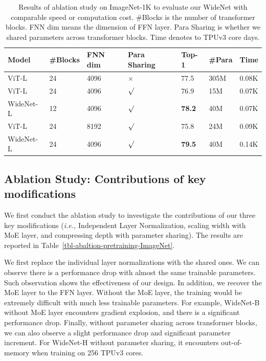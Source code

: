 \documentclass[letterpaper]{article} %
\newcommand{\ie}{\emph{i.e.,}\xspace}
\begin{document}
\begin{table}[t]
\centering
\caption{Results of ablation study on ImageNet-1K to evaluate our WideNet with comparable speed or computation cost. \#Blocks is the number of transformer blocks. FNN dim means the dimension of FFN layer. Para Sharing is whether we shared parameters across transformer blocks. Time denotes to TPUv3 core days.}
\label{tbl-abaltion-2-pretraining-ImageNet}
\begin{tabular}{l|llllll}
\toprule
Model                    & \#Blocks    & FNN dim   & Para Sharing   & Top-1 & \#Para & Time \\ \midrule
ViT-L                     & 24     & 4096    & $\times$  & 77.5 & 305M       & 0.08K         \\
ViT-L                     & 24     & 4096    & $\surd$  & 76.9 & 15M       & 0.07K         \\
WideNet-L                 & 12     & 4096    & $\surd$  & \textbf{78.2} & 40M        & 0.07K          \\ \midrule
ViT-L    & 24     & 8192   & $\surd$  & 75.8 & 24M        & 0.09K         \\
WideNet-L                   & 24    & 4096   & $\surd$  & \textbf{79.5} & 40M        & 0.14K       \\
\bottomrule
\end{tabular}
\end{table}





\subsection{Ablation Study: Contributions of key modifications}
We first conduct the ablation study to investigate the contributions of our three key modifications (\ie Independent Layer Normalization, scaling width with MoE layer, and compressing depth with parameter sharing). The results are reported in Table~\ref{tbl-abaltion-pretraining-ImageNet}. 


We first replace the individual layer normalizations with the shared ones. We can observe there is a performance drop with almost the same trainable parameters. Such observation shows the effectiveness of our design. In addition, we recover the MoE layer to the FFN layer. Without the MoE layer, the training would be extremely difficult with much less trainable parameters. For example, WideNet-B without MoE layer encounters gradient explosion, and there is a significant performance drop. Finally, without parameter sharing across transformer blocks, we can also observe a slight performance drop and significant parameter increment. For WideNet-H without parameter sharing, it encounters out-of-memory when training on 256 TPUv3 cores. 
\end{document}
